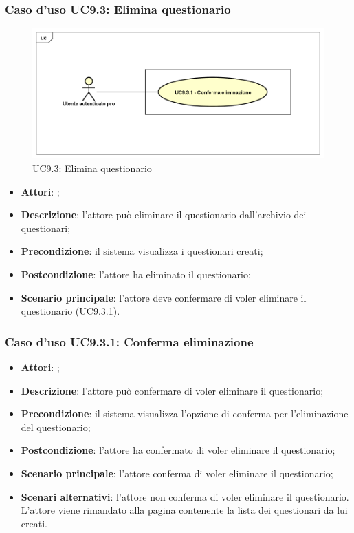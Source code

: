 	\subsubsection{Caso d'uso UC9.3: Elimina questionario}
	\label{UC9.3}
	\begin{figure}[h]
		\centering
	\includegraphics[scale=0.5,keepaspectratio]{UML/UC9_3.png}
		\caption{UC9.3: Elimina questionario}
	\end{figure}
	\FloatBarrier
	\begin{itemize}
		\item \textbf{Attori}: \uaupro{};
		\item \textbf{Descrizione}: l'attore può eliminare il questionario dall'archivio dei questionari;
		\item \textbf{Precondizione}: il sistema visualizza i questionari creati;
		\item \textbf{Postcondizione}: l'attore ha eliminato il questionario;
		\item \textbf{Scenario principale}: l'attore deve confermare di voler eliminare il questionario (UC9.3.1).
	\end{itemize}
	
		\subsubsection{Caso d'uso UC9.3.1: Conferma eliminazione}
		\label{UC9.3.1}
		\begin{itemize}
			\item \textbf{Attori}: \uaupro{};
			\item \textbf{Descrizione}: l'attore può confermare di voler eliminare il questionario; 
			\item \textbf{Precondizione}: il sistema visualizza l'opzione di conferma per l'eliminazione del questionario;
			\item \textbf{Postcondizione}: l'attore ha confermato di voler eliminare il questionario;
			\item \textbf{Scenario principale}: l'attore conferma di voler eliminare il questionario;
			\item \textbf{Scenari alternativi}: l'attore non conferma di voler eliminare il questionario. L'attore viene rimandato alla pagina contenente la lista dei questionari da lui creati.
		\end{itemize}
								
